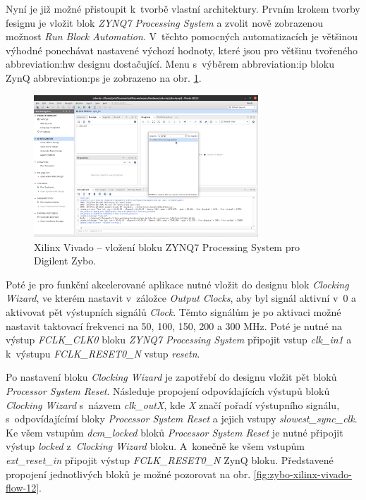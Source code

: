 \documentclass[a4paper, twoside, 11pt]{article}
\newcommand{\fbar}{\FloatBarrier}
\begin{document}
\begin{appendices}
		Nyní je již možné přistoupit k~tvorbě vlastní architektury. Prvním krokem tvorby fesignu je vložit blok \textit{ZYNQ7 Processing System} a zvolit nově zobrazenou možnost \textit{Run Block Automation}. V~těchto pomocných automatizacích je většinou výhodné ponechávat nastavené výchozí hodnoty, které jsou pro většinu tvořeného \gls{abbreviation:hw} designu dostačující. Menu s~výběrem \gls{abbreviation:ip} bloku ZynQ \gls{abbreviation:ps} je zobrazeno na obr. \ref{fig:zybo-xilinx-vivado-flow-07}.

		\begin{figure}[htbp!]
			\centering
			\includegraphics[width=0.75\textwidth]{src/png/zybo-xilinx-vivado-flow/zybo-xilinx-vivado-flow-07.jpg}
			\caption{Xilinx Vivado – vložení bloku ZYNQ7 Processing System pro Digilent Zybo.}
			\label{fig:zybo-xilinx-vivado-flow-07}
		\end{figure}

		\fbar
		Poté je pro funkční akcelerované aplikace nutné vložit do designu blok \textit{Clocking Wizard}, ve kterém nastavit v~záložce \textit{Output Clocks}, aby byl signál aktivní v~0 a aktivovat pět výstupních signálů \textit{Clock}. Těmto signálům je po aktivaci možné nastavit taktovací frekvenci na 50, 100, 150, 200 a 300 MHz. Poté je nutné na výstup \textit{FCLK\_CLK0} bloku \textit{ZYNQ7 Processing System} připojit vstup \textit{clk\_in1} a k~výstupu \textit{FCLK\_RESET0\_N} vstup \textit{resetn}.\par
		Po nastavení bloku \textit{Clocking Wizard} je zapotřebí do designu vložit pět bloků \textit{Processor System Reset}. Následuje propojení odpovídajících výstupů bloků \textit{Clocking Wizard} s~názvem \textit{clk\_outX}, kde \textit{X} značí pořadí výstupního signálu, s~odpovídajícímí bloky \textit{Processor System Reset} a jejich vstupy \textit{slowest\_sync\_clk}. Ke všem vstupům \textit{dcm\_locked} bloků \textit{Processor System Reset} je nutné připojit výstup \textit{locked} z~\textit{Clocking Wizard} bloku. A~konečně ke všem vstupům \textit{ext\_reset\_in} připojit výstup \textit{FCLK\_RESET0\_N} ZynQ bloku. Představené propojení jednotlivých bloků je možné pozorovat na obr. \ref{fig:zybo-xilinx-vivado-flow-12}.


\end{appendices}
\end{document}
